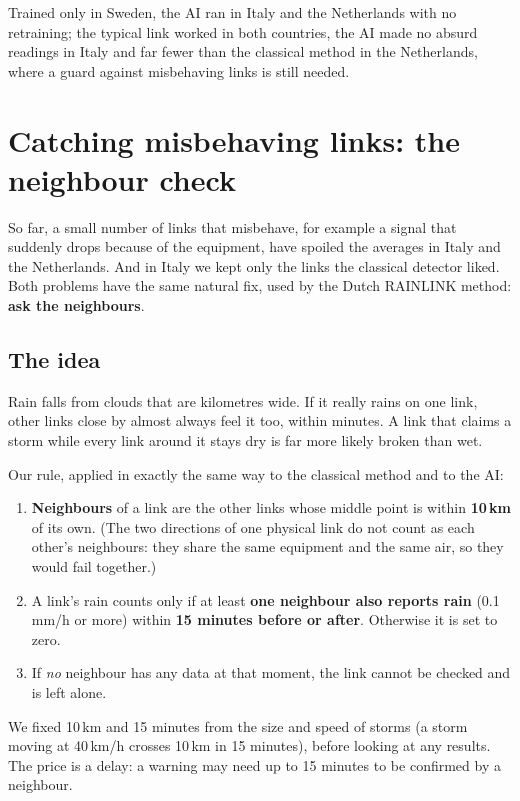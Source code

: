 \begin{oneline}
Trained only in Sweden, the AI ran in Italy and the Netherlands with no retraining; the typical link worked in both
countries, the AI made no absurd readings in Italy and far fewer than the classical method in the Netherlands, where a guard
against misbehaving links is still needed.
\end{oneline}

\section{Catching misbehaving links: the neighbour check}
\label{sec:neighbours}

So far, a small number of links that misbehave, for example a signal that suddenly drops because of the equipment, have
spoiled the averages in Italy and the Netherlands. And in Italy we kept only the links the classical detector liked. Both
problems have the same natural fix, used by the Dutch RAINLINK method: \textbf{ask the neighbours}.

\subsection{The idea}
Rain falls from clouds that are kilometres wide. If it really rains on one link, other links close by almost always feel it
too, within minutes. A link that claims a storm while every link around it stays dry is far more likely broken than wet.

Our rule, applied in exactly the same way to the classical method and to the AI:
\begin{enumerate}
\item \textbf{Neighbours} of a link are the other links whose middle point is within \textbf{10\,km} of its own. (The two
directions of one physical link do not count as each other's neighbours: they share the same equipment and the same air,
so they would fail together.)
\item A link's rain counts only if at least \textbf{one neighbour also reports rain} (0.1\,mm/h or more) within
\textbf{15 minutes before or after}. Otherwise it is set to zero.
\item If \emph{no} neighbour has any data at that moment, the link cannot be checked and is left alone.
\end{enumerate}
We fixed 10\,km and 15 minutes from the size and speed of storms (a storm moving at 40\,km/h crosses 10\,km in 15 minutes),
before looking at any results. The price is a delay: a warning may need up to 15 minutes to be confirmed by a neighbour.

